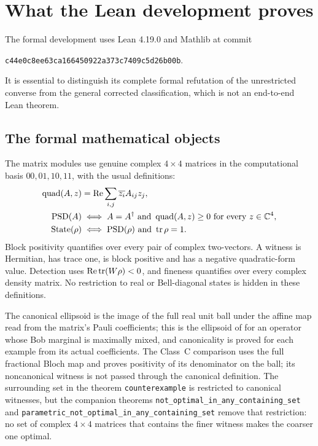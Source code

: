 \section{What the Lean development proves}\label{app:formal}

The formal development uses Lean 4.19.0 and Mathlib at commit
\begin{center}\small\texttt{c44e0c8ee63ca166450922a373c7409c5d26b00b}.\end{center}
It is essential to distinguish its complete formal refutation of the unrestricted converse from the general corrected classification, which is not an end-to-end Lean theorem.

\subsection{The formal mathematical objects}

The matrix modules use genuine complex $4\times4$ matrices in the computational basis $00,01,10,11$, with the usual definitions:
\begin{align*}
 \operatorname{quad}(A,z)&=\operatorname{Re}\sum_{i,j}\overline{z_i}A_{ij}z_j,\\
 \operatorname{PSD}(A)&\iff A=A^\dagger\ \text{and}\ \operatorname{quad}(A,z)\geq0\ \text{for every }z\in\C^4,\\
 \operatorname{State}(\rho)&\iff\operatorname{PSD}(\rho)\ \text{and}\ \tr\rho=1.
\end{align*}
Block positivity quantifies over every pair of complex two-vectors. A witness is Hermitian, has trace one, is block positive and has a negative quadratic-form value. Detection uses $\operatorname{Re}\operatorname{tr}(W\rho)<0$, and fineness quantifies over every complex density matrix. No restriction to real or Bell-diagonal states is hidden in these definitions.

The canonical ellipsoid is the image of the full real unit ball under the affine map read from the matrix's Pauli coefficients; this is the ellipsoid of \cite{milne} for an operator whose Bob marginal is maximally mixed, and canonicality is proved for each example from its actual coefficients. The Class~C comparison uses the full fractional Bloch map and proves positivity of its denominator on the ball; its noncanonical witness is not passed through the canonical definition. The surrounding set in the theorem \texttt{counterexample} is restricted to canonical witnesses, but the companion theorems \texttt{not\_optimal\_in\_any\_containing\_set} and \texttt{parametric\_not\_optimal\_in\_any\_containing\_set} remove that restriction: no set of complex $4\times4$ matrices that contains the finer witness makes the coarser one optimal.


